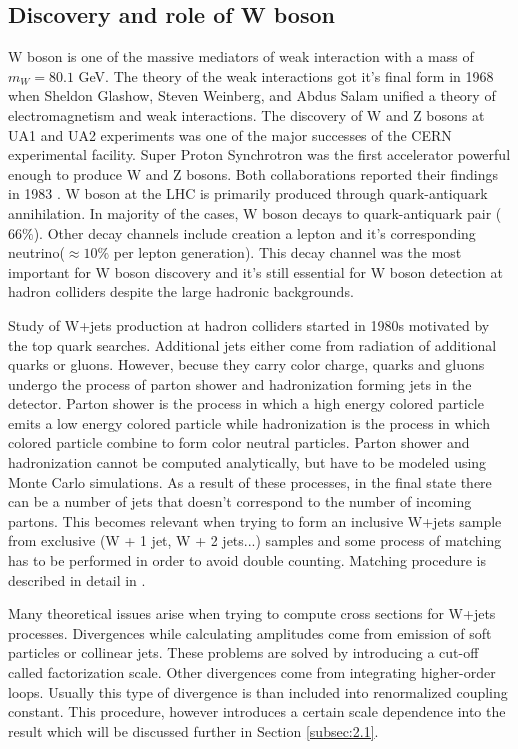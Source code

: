 
\subsection{Discovery and role of W boson}

W boson is one of the massive mediators of weak interaction with a mass of $m_W=80.1$ GeV.
The theory of the weak interactions got it's final form in 1968 when Sheldon Glashow, Steven Weinberg, and Abdus Salam unified a theory of electromagnetism and weak interactions. The discovery of W and Z bosons at UA1 and UA2 experiments was one of the major successes of the CERN experimental facility. Super Proton Synchrotron was the first accelerator powerful enough to produce W and Z bosons. Both collaborations reported their findings in 1983 \cite{Arnison:1983rp,Banner:1983jy}.
W boson at the LHC is primarily produced through quark-antiquark annihilation. In majority of the cases, W boson decays to quark-antiquark pair ($66\%$). Other decay channels include creation a lepton and it's corresponding neutrino($\approx 10\%$ per lepton generation). This decay channel was the most important for W boson discovery and it's still essential for W boson detection at hadron colliders despite the large hadronic backgrounds. 
\par Study of W+jets production at hadron colliders started in 1980s motivated by the top quark searches. Additional jets either come from radiation of additional quarks or gluons. However, becuse they carry color charge, quarks and gluons undergo the process of parton shower and hadronization forming jets in the detector. Parton shower is the process in which a high energy colored particle emits a low energy colored particle while hadronization is the process in which colored particle combine to form color neutral particles. Parton shower and hadronization cannot be computed analytically, but have to be modeled using Monte Carlo simulations. As a result of these processes, in the final state there can be a number of jets that doesn't  correspond to the number of incoming partons. This becomes relevant when trying to form an inclusive W+jets sample from exclusive (W + 1 jet, W + 2 jets...) samples and some process of matching has to be performed in order to avoid double counting. Matching procedure is described in detail in \cite{Campbell:2008cr}.  
\par Many theoretical issues arise when trying to compute cross sections for W+jets processes. Divergences while calculating amplitudes come from emission of soft particles or collinear jets. These problems are solved by introducing a cut-off called factorization scale. Other divergences come from integrating higher-order loops. Usually this type of divergence is than included into renormalized coupling constant. This procedure, however introduces a certain scale dependence into the result which will be discussed further in Section \ref{subsec:2.1}. 


